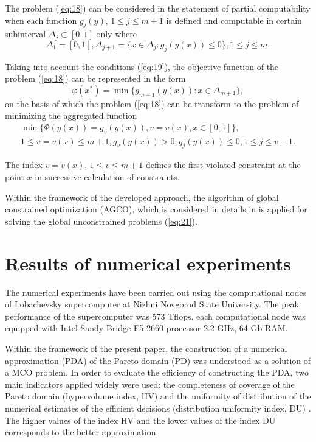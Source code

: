 \documentclass[runningheads]{llncs}
\begin{document}
The problem (\ref{eq:18}) can be considered in the statement of partial computability when each function $g_j (y)$, $1 \leq j \leq m+1$ is defined and computable in certain subinterval $\Delta_j \subset [0,1]$ only where
\begin{equation}\label{eq:19}
	\Delta_1=[0,1], \Delta_{j+1}=\{ x \in \Delta_j  : g_j (y(x))\leq 0 \}, 1\leq j\leq m.
\end{equation}

Taking into account the conditions (\ref{eq:19}), the objective function of the problem (\ref{eq:18}) can be represented in the form 
\begin{equation}\label{eq:20}
	\varphi(x^*)=\min{\{ g_{m+1} (y(x)) : x\in \Delta_{m+1} \}},
\end{equation}
on the basis of which the problem (\ref{eq:18}) can be transform to the problem of minimizing the aggregated function 
\begin{equation}\label{eq:21}
\begin{split}
	\min{\{ \Phi(y(x))=g_v(y(x)), v=v(x), x\in[0,1] \}}, \\	
	1\leq v=v(x)\leq m+1, g_v (y(x))>0, g_j (y(x))\leq 0, 1\leq j\leq v-1.
\end{split}
\end{equation}

The index $v=v(x)$, $1\leq v \leq m+1$ defines the first violated constraint at the point $x$ in successive calculation of constraints.

Within the framework of the developed approach, the algorithm of global constrained optimization (AGCO), which is considered in details in \cite{c11} is applied for solving the global unconstrained problems (\ref{eq:21}).



\section{Results of numerical experiments}	
\label{sec:06}
The numerical experiments have been carried out using the computational nodes of Lobachevsky supercomputer at Nizhni Novgorod State University. The peak performance of the supercomputer was 573 Tflops, each computational node was equipped with Intel Sandy Bridge E5-2660 processor 2.2 GHz, 64 Gb RAM. 

Within the framework of the present paper, the construction of a numerical approximation (PDA) of the Pareto domain (PD) was understood as a solution of a MCO problem. In order to evaluate the efficiency of constructing the PDA, two main indicators applied widely were used: the completeness of coverage of the Pareto domain (hypervolume index, HV) and the uniformity of distribution of the numerical estimates of the efficient decisions (distribution uniformity index, DU) \cite{c10}. The higher values of the index HV and the lower values of the index DU corresponds to the better approximation. 
\end{document}
